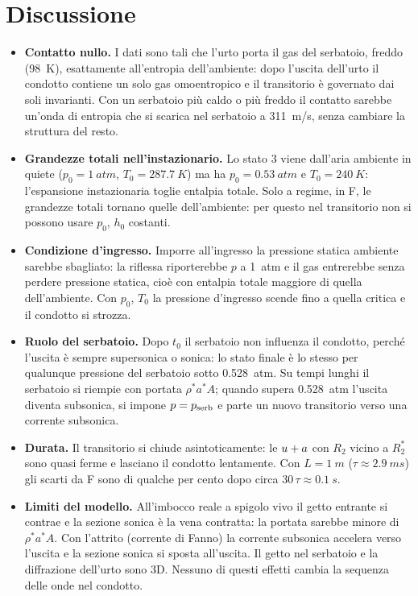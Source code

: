 \section*{Discussione}
\begin{itemize}
\item \textbf{Contatto nullo.} I dati sono tali che l'urto porta il gas del serbatoio, freddo (\SI{98}{K}), esattamente
  all'entropia dell'ambiente: dopo l'uscita dell'urto il condotto contiene un solo gas omoentropico e il transitorio è
  governato dai soli invarianti. Con un serbatoio più caldo o più freddo il contatto sarebbe un'onda di entropia che si
  scarica nel serbatoio a \SI{311}{m/s}, senza cambiare la struttura del resto.
\item \textbf{Grandezze totali nell'instazionario.} Lo stato 3 viene dall'aria ambiente in quiete ($p_0=\SI{1}{atm}$,
  $T_0=\SI{287.7}{K}$) ma ha $p_0=\SI{0.53}{atm}$ e $T_0=\SI{240}{K}$: l'espansione instazionaria toglie entalpia
  totale. Solo a regime, in F, le grandezze totali tornano quelle dell'ambiente: per questo nel transitorio non si
  possono usare $p_0$, $h_0$ costanti.
\item \textbf{Condizione d'ingresso.} Imporre all'ingresso la pressione statica ambiente sarebbe sbagliato: la riflessa
  riporterebbe $p$ a \SI{1}{atm} e il gas entrerebbe senza perdere pressione statica, cioè con entalpia totale maggiore
  di quella dell'ambiente. Con $p_0$, $T_0$ la pressione d'ingresso scende fino a quella critica e il condotto si
  strozza.
\item \textbf{Ruolo del serbatoio.} Dopo $t_0$ il serbatoio non influenza il condotto, perché l'uscita è sempre
  supersonica o sonica: lo stato finale è lo stesso per qualunque pressione del serbatoio sotto \SI{0.528}{atm}. Su
  tempi lunghi il serbatoio si riempie con portata $\rho^*a^*A$; quando supera \SI{0.528}{atm} l'uscita diventa
  subsonica, si impone $p=p_{\rm serb}$ e parte un nuovo transitorio verso una corrente subsonica.
\item \textbf{Durata.} Il transitorio si chiude asintoticamente: le $u+a$ con $R_2$ vicino a $R_2^*$ sono quasi ferme e
  lasciano il condotto lentamente. Con $L=\SI{1}{m}$ ($\tau\approx\SI{2.9}{ms}$) gli scarti da F sono di qualche per cento
  dopo circa $30\,\tau\approx\SI{0.1}{s}$.
\item \textbf{Limiti del modello.} All'imbocco reale a spigolo vivo il getto entrante si contrae e la sezione sonica è la
  vena contratta: la portata sarebbe minore di $\rho^*a^*A$. Con l'attrito (corrente di Fanno) la corrente subsonica
  accelera verso l'uscita e la sezione sonica si sposta all'uscita. Il getto nel serbatoio e la diffrazione dell'urto
  sono 3D. Nessuno di questi effetti cambia la sequenza delle onde nel condotto.
\end{itemize}


